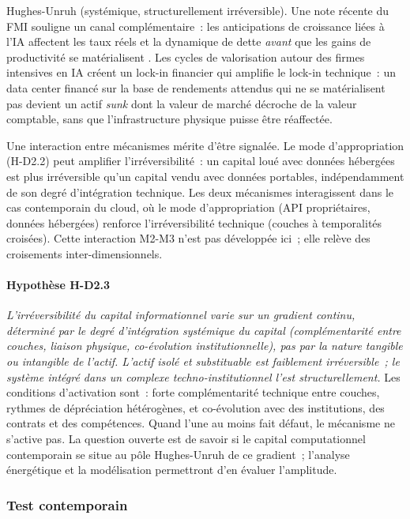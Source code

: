 Hughes-Unruh (systémique, structurellement irréversible). Une note récente du FMI souligne un canal complémentaire~: les anticipations de croissance liées à l'IA affectent les taux réels et la dynamique de dette \emph{avant} que les gains de productivité se matérialisent \parencite{barhoumi_imf_ai_2026}. Les cycles de valorisation autour des firmes intensives en IA créent un lock-in financier qui amplifie le lock-in technique~: un data center financé sur la base de rendements attendus qui ne se matérialisent pas devient un actif \emph{sunk} dont la valeur de marché décroche de la valeur comptable, sans que l'infrastructure physique puisse être réaffectée.

Une interaction entre mécanismes mérite d'être signalée. Le mode d'appropriation (H-D2.2) peut amplifier l'irréversibilité~: un capital loué avec données hébergées est plus irréversible qu'un capital vendu avec données portables, indépendamment de son degré d'intégration technique. Les deux mécanismes interagissent dans le cas contemporain du cloud, où le mode d'appropriation (API propriétaires, données hébergées) renforce l'irréversibilité technique (couches à temporalités croisées). Cette interaction M2-M3 n'est pas développée ici~; elle relève des croisements inter-dimensionnels.

\paragraph{Hypothèse H-D2.3} \emph{L'irréversibilité du capital informationnel varie sur un gradient continu, déterminé par le degré d'intégration systémique du capital (complémentarité entre couches, liaison physique, co-évolution institutionnelle), pas par la nature tangible ou intangible de l'actif. L'actif isolé et substituable est faiblement irréversible~; le système intégré dans un complexe techno-institutionnel l'est structurellement.} Les conditions d'activation sont~: forte complémentarité technique entre couches, rythmes de dépréciation hétérogènes, et co-évolution avec des institutions, des contrats et des compétences. Quand l'une au moins fait défaut, le mécanisme ne s'active pas. La question ouverte est de savoir si le capital computationnel contemporain se situe au pôle Hughes-Unruh de ce gradient~; l'analyse énergétique et la modélisation permettront d'en évaluer l'amplitude.

\subsubsection{Test contemporain}

